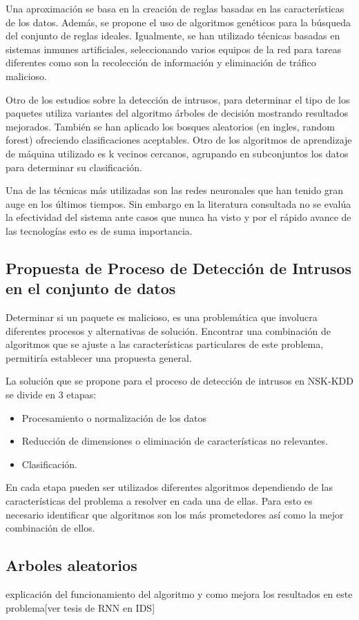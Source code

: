 Una aproximación se basa en la creación de reglas basadas en las características de los datos. Además, se propone el uso de algoritmos genéticos para la búsqueda del conjunto de reglas ideales. Igualmente, se han utilizado técnicas basadas en sistemas inmunes artificiales, seleccionando varios equipos de la red para tareas diferentes como son la recolección de información y eliminación de tráfico malicioso.

Otro de los estudios sobre la detección de intrusos, para determinar el tipo de los paquetes utiliza variantes del algoritmo árboles de decisión mostrando resultados mejorados. También se han aplicado los bosques aleatorios (en ingles, random forest) ofreciendo clasificaciones aceptables. Otro de los algoritmos de aprendizaje de máquina utilizado es k vecinos cercanos, agrupando en subconjuntos los datos para determinar su clasificación.

Una de las técnicas más utilizadas son las redes neuronales que han tenido gran auge en los últimos tiempos. Sin embargo en la literatura consultada no se evalúa la efectividad del sistema ante casos que nunca ha visto y por el rápido avance de las tecnologías esto es de suma importancia.

\subsection{Propuesta de Proceso de Detección de Intrusos en el conjunto de datos}
Determinar si un paquete es malicioso, es una problemática que involucra diferentes procesos y alternativas de solución. Encontrar una combinación de algoritmos que se ajuste a las características particulares de este problema, permitiría establecer una propuesta general.

La solución que se propone para el proceso de detección de intrusos en NSK-KDD se divide en 3 etapas:

\begin{itemize}
    \item Procesamiento o normalización de los datos
    \item Reducción de dimensiones o eliminación de características no relevantes.
    \item Clasificación.
\end{itemize}

En cada etapa pueden ser utilizados diferentes algoritmos dependiendo de las características del problema a resolver en cada una de ellas. Para esto es necesario identificar que algoritmos son los más prometedores así como la mejor combinación de ellos.

\subsection{Arboles aleatorios}
explicación del funcionamiento del algoritmo y como mejora los resultados en este problema[ver tesis de RNN en IDS]